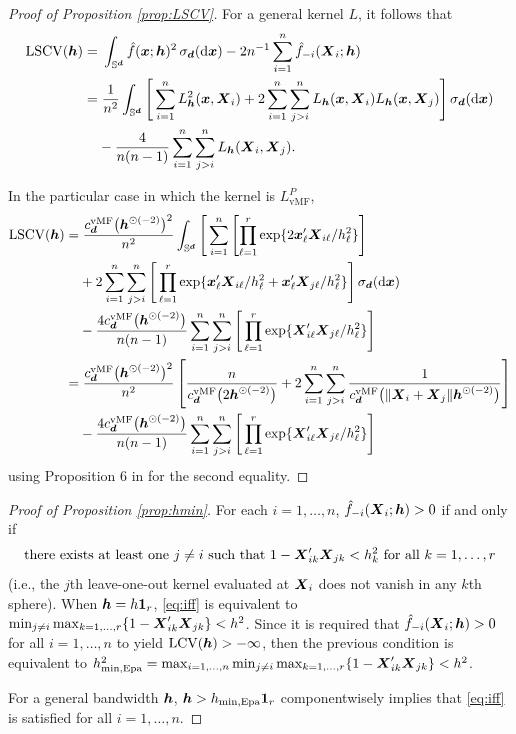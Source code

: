 \documentclass[oneside,11pt]{article}
\begin{document}
\begin{proof}[Proof of Proposition \ref{prop:LSCV}] For a general kernel $L$, it follows that
\begin{align*}
\mathrm{LSCV}(\bh)=&\;\int_{\Sr}\hat{f}(\bx;\bh)^2 \,\sigmar (\rd\bx)-2n^{-1}\sum_{i=1}^n\hat{f}_{-i}(\bX_i;\bh)\\
    =&\;\frac{1}{n^2}\int_{\Sr}\Bigg[\sum_{i=1}^n L^2_{\bh}(\bx,\bX_i)+2\sum_{i=1}^n\sum_{j>i}^n L_{\bh}(\bx,\bX_i)L_{\bh}(\bx,\bX_j)\Bigg] \,\sigmar (\rd\bx)\\
    &-\frac{4}{n(n-1)}\sum_{i=1}^n\sum_{j>i}^n L_{\bh}(\bX_i,\bX_j).%
\end{align*}

In the particular case in which the kernel is $L_\mathrm{vMF}^P$,
\begin{align*}
\mathrm{LSCV}({\boldsymbol{h}})
 =&\;\frac{c_{\boldsymbol{d}}^{\mathrm{vMF}}\big({\boldsymbol{h}}^{\odot(-2)}\big)^2}{n^2}\int_{\mathbb{S}^{\boldsymbol{d}}}\Bigg[\sum_{i=1}^n\left[\prod_{\ell=1}^r \exp\{2\boldsymbol{x}_{\ell}'\boldsymbol{X}_{i\ell}/h_\ell^2\}\right]\\
    &+2\sum_{i=1}^n\sum_{j>i}^n \Bigg[\prod_{\ell=1}^r\exp\{\boldsymbol{x}_{\ell}'\boldsymbol{X}_{i\ell}/h_\ell^2+\boldsymbol{x}_{\ell}'\boldsymbol{X}_{j\ell}/h_\ell^2\}\Bigg] \,\sigma_{\boldsymbol{d}} (\mathrm{d}\boldsymbol{x})\\
    &-\frac{4 c_{\boldsymbol{d}}^{\mathrm{vMF}}\big({\boldsymbol{h}}^{\odot(-2)}\big)}{n(n-1)}\sum_{i=1}^n\sum_{j>i}^n \Bigg[\prod_{\ell=1}^r \exp\{\boldsymbol{X}_{i\ell}'\boldsymbol{X}_{j\ell}/h_\ell^2\}\Bigg]\\
    =&\;\frac{c_{\boldsymbol{d}}^{\mathrm{vMF}}\big({\boldsymbol{h}}^{\odot(-2)}\big)^2}{n^2}\left[\frac{n}{ c_{\boldsymbol{d}}^{\mathrm{vMF}}\big(2 {\boldsymbol{h}}^{\odot(-2)}\big)}+2\sum_{i=1}^n\sum_{j>i}^n\frac{1}{ c_{\boldsymbol{d}}^{\mathrm{vMF}}\big(\|\boldsymbol{X}_i+\boldsymbol{X}_j\|  {\boldsymbol{h}}^{\odot(-2)}\big)}\right]\\
    &-\frac{4 c_{\boldsymbol{d}}^{\mathrm{vMF}}\big({\boldsymbol{h}}^{\odot(-2)}\big)}{n(n-1)}\sum_{i=1}^n\sum_{j>i}^n \Bigg[\prod_{\ell=1}^r \exp\{\boldsymbol{X}_{i\ell}'\boldsymbol{X}_{j\ell}/h_\ell^2\}\Bigg]
\end{align*}
using Proposition 6 in \cite{Garcia-Portugues2013b} for the second equality.
\end{proof}

\begin{proof}[Proof of Proposition \ref{prop:hmin}]
For each $i=1,\ldots,n$, $\hat{f}_{-i}(\boldsymbol{X}_i;{\boldsymbol{h}})>0$ if and only if
\begin{align}
    \text{there exists at least one }j\neq i\text{ such that }1-\boldsymbol{X}_{ik}'\boldsymbol{X}_{jk}<h_{k}^2\text{ for all }k=1,\ldots,r \label{eq:iff}
\end{align}
(i.e., the $j$th leave-one-out kernel evaluated at $\boldsymbol{X}_i$ does not vanish in any $k$th sphere). When ${\boldsymbol{h}}=h\mathbf{1}_r$, \eqref{eq:iff} is equivalent to $\min_{j\neq i} \max_{k=1,\ldots,r}\{1-\boldsymbol{X}_{ik}'\boldsymbol{X}_{jk}\}<h^2$. Since it is required that $\hat{f}_{-i}(\boldsymbol{X}_i;{\boldsymbol{h}})>0$ for all $i=1,\ldots,n$ to yield $\mathrm{LCV}({\boldsymbol{h}})>-\infty$, then the previous condition is equivalent to $h_{\min,\mathrm{Epa}}^2=\max_{i=1,\ldots,n}\min_{j\neq i}\max_{k=1,\ldots,r}\{1-\boldsymbol{X}_{ik}'\boldsymbol{X}_{jk}\}< h^2$.

For a general bandwidth ${\boldsymbol{h}}$, ${\boldsymbol{h}}>h_{\min,\mathrm{Epa}}\mathbf{1}_r$ componentwisely implies that \eqref{eq:iff} is satisfied for all $i=1,\ldots,n$.
\end{proof}
\end{document}
